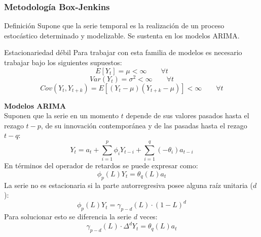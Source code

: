\documentclass[10pt,a4paper,twoside]{beamer}
\begin{document}

\begin{frame}
\frametitle{Metodología Box-Jenkins}

\begin{block}{Definición}
Supone que la serie temporal es la realización de un proceso estocástico determinado y modelizable. Se sustenta en los modelos ARIMA.
\end{block}

\vspace{0.3cm}

\vspace{0.5cm}
\begin{block}{Estacionariedad débil}
Para trabajar con esta familia de modelos es necesario trabajar bajo los siguientes supuestos:
\begin{equation*}
    E[Y_{t}]=\mu<\infty \quad \quad \forall{t}
\end{equation*}
\begin{equation*}
   Var(Y_{t})=\sigma^2<\infty \quad \quad \forall{t}
\end{equation*}
\begin{equation*}
    Cov(Y_{t},Y_{t+k})=E[(Y_{t}-\mu)(Y_{t+k}-\mu)]<\infty \quad \quad \forall{t}
\end{equation*}
\end{block}

\vspace{-0.2cm}

\vspace{0.15cm}

\end{frame}


\begin{frame}
\textbf{Modelos ARIMA}\\
Suponen que la serie en un momento $t$ depende de sus valores pasados hasta el rezago $t-p$, de su innovación contemporánea y de las pasadas hasta el rezago $t-q$:
\begin{equation*}
    Y_{t} = a_{t} + \sum_{i=1}^{p} \phi_{i} Y_{t-i} + \sum_{i=1}^{q} (-\theta_{i}) a_{t-i}
\end{equation*}
En términos del operador de retardos se puede expresar como:
\begin{equation*}
    \phi_{p}(L)Y_{t} = \theta_{q}(L)a_{t}
\end{equation*}
La serie no es estacionaria si la parte autorregresiva posee alguna raíz unitaria ($d$):
\begin{equation*}
\phi_{p}(L)Y_{t} = \gamma_{p-d}(L)\cdot(1-L)^{d}
\end{equation*}
Para solucionar esto se diferencia la serie $d$ veces:
\begin{equation*}
\gamma_{p-d}(L)\cdot\Delta^{d}Y_{t}=\theta_{q}(L)a_{t}
\end{equation*}

\end{frame}
\end{document}
